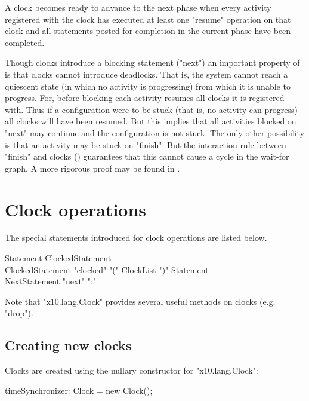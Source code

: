 A clock becomes ready to advance to the next phase when every activity
registered with the clock has executed at least one \xcd"resume"
operation on that clock and all statements posted for completion in
the current phase have been completed.

Though clocks introduce a blocking statement (\xcd"next") an important
property of \Xten{} is that clocks cannot introduce deadlocks. That
is, the system cannot reach a quiescent state (in which no activity is
progressing) from which it is unable to progress. For, before blocking
each activity resumes all clocks it is registered with. Thus if a
configuration were to be stuck (that is, no activity can progress) all
clocks will have been resumed. But this implies that all activities
blocked on \xcd"next" may continue and the configuration is not stuck.
The only other possibility is that an activity may be stuck on
\xcd"finish". But the interaction rule between \xcd"finish" and clocks
() guarantees that this cannot cause a cycle
in the wait-for graph. A more rigorous proof may be found in \cite{X10-concur05}.

\section{Clock operations}\label{sec:clock}
The special statements introduced for clock operations are listed below.

\begin{grammar}
Statement \: ClockedStatement \\
ClockedStatement \: \xcd"clocked" \xcd"(" ClockList \xcd")" Statement \\
NextStatement \: \xcd"next" \xcd";" \\
\end{grammar}

Note that \xcd"x10.lang.Clock" provides several useful methods on
clocks (e.g. \xcd"drop").

\subsection{Creating new clocks}\label{sec:clock:create}

Clocks are created using the nullary constructor for \xcd"x10.lang.Clock":

\begin{xten}
timeSynchronizer: Clock = new Clock();
\end{xten}

